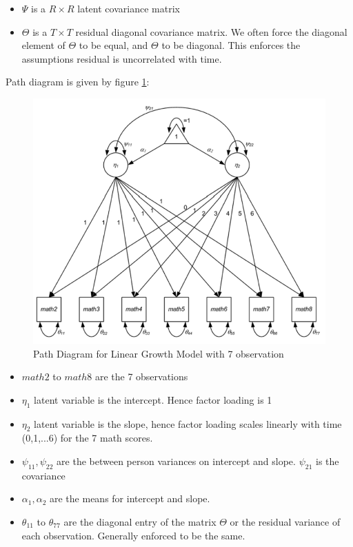     \begin{itemize}
        \item $\Psi$ is a $R \times R$ latent covariance matrix 
        \item $\Theta$ is a $T \times T$ residual diagonal covariance matrix. We often force the diagonal element of $\Theta$ to be equal, and $\Theta$ to be diagonal. This enforces the assumptions residual is uncorrelated with time. 
    \end{itemize}
Path diagram is given by figure \ref{fig:linear_growth_mod_path_exp}:  
    \begin{figure}[ht]
        \centering
        \includegraphics{images/004_linear_growth_model_path.png}
        \caption{Path Diagram for Linear Growth Model with 7 observation}
        \label{fig:linear_growth_mod_path_exp}
    \end{figure}
    \begin{itemize}
        \item $math2$ to $math8$ are the 7 observations 
        \item $\eta_1$ latent variable is the intercept. Hence factor loading is 1 
        \item $\eta_2$ latent variable is the slope, hence factor loading scales linearly with time (0,1,...6) for the 7 math scores. 
        \item $\psi_{11}, \psi_{22}$ are the between person variances on intercept and slope. $\psi_{21}$ is the covariance 
        \item $\alpha_1, \alpha_2$ are the means for intercept and slope. 
        \item $\theta_{11}$ to $\theta_{77}$ are the diagonal entry of the matrix $\Theta$ or the residual variance of each observation. Generally enforced to be the same. 
    \end{itemize}
